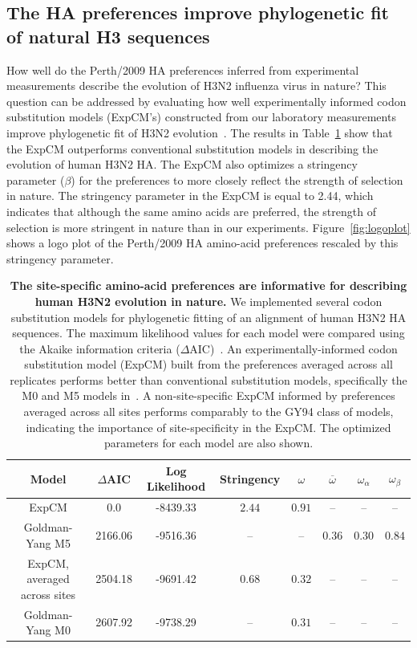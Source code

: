 \documentclass[11pt]{article}
\begin{document}
\subsection*{The HA preferences improve phylogenetic fit of natural H3 sequences}
How well do the Perth/2009 HA preferences inferred from experimental measurements describe the evolution of H3N2 influenza virus in nature?
This question can be addressed by evaluating how well experimentally informed codon substitution models (ExpCM's) constructed from our laboratory measurements improve phylogenetic fit of H3N2 evolution~\citep{hilton2017phydms}.
The results in Table~\ref{tab:phydms} show that the ExpCM outperforms conventional substitution models in describing the evolution of human H3N2 HA. 
The ExpCM also optimizes a stringency parameter ($\beta$) for the preferences to more closely reflect the strength of selection in nature.
The stringency parameter in the ExpCM is equal to 2.44, which indicates that although the same amino acids are preferred, the strength of selection is more stringent in nature than in our experiments.
Figure~\ref{fig:logoplot} shows a logo plot of the Perth/2009 HA amino-acid preferences rescaled by this stringency parameter.

\begin{table}
\centering
\begin{tabular}{cccccccc}
\hline
\bf{Model} & \bf{$\Delta$AIC} & \bf{Log Likelihood} & \bf{Stringency} & \bf{$\omega$} & \bf{$\overline{\omega}$} & \bf{$\omega_{\alpha}$} & \bf{$\omega_{\beta}$} \\ \hline
ExpCM & 0.0 & -8439.33 & $2.44$ & $0.91$ & -- & -- & -- \\
Goldman-Yang M5 & 2166.06 & -9516.36 & -- & -- & $0.36$ & $0.30$ & $0.84$ \\
ExpCM, averaged across sites & 2504.18 & -9691.42 & $0.68$ & $0.32$ & -- & -- & -- \\
Goldman-Yang M0 & 2607.92 & -9738.29 & -- & $0.31$ & -- & -- & -- \\
\hline
\end{tabular}
\caption{\label{tab:phydms}
{\bf The site-specific amino-acid preferences are informative for describing human H3N2 evolution in nature.}
We implemented several codon substitution models for phylogenetic fitting of an alignment of human H3N2 HA sequences. 
The maximum likelihood values for each model were compared using the Akaike information criteria ($\Delta$AIC)~\citep{posada2004model}.
An experimentally-informed codon substitution model (ExpCM) built from the preferences averaged across all replicates performs better than conventional substitution models, specifically the M0 and M5 models in~\cite{yang2000codon}.
A non-site-specific ExpCM informed by preferences averaged across all sites performs comparably to the GY94 class of models, indicating the importance of site-specificity in the ExpCM.
The optimized parameters for each model are also shown.
}
\end{table}
\end{document}
